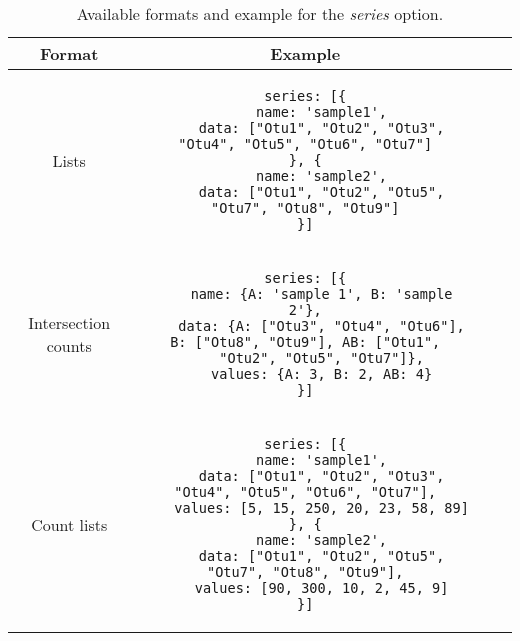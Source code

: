 \documentclass{bmcart}
\begin{document}
\begin{backmatter}
\begin{table}[h!]
\caption{Available formats and example for the \textit{series} option.}
      \begin{tabular}{cccc}
        \hline
        Format & Example\\ \hline
        Lists & 
\begin{lstlisting}
series: [{
	name: 'sample1',
	data: ["Otu1", "Otu2", "Otu3", "Otu4", "Otu5", "Otu6", "Otu7"]
}, {
	name: 'sample2',
	data: ["Otu1", "Otu2", "Otu5", "Otu7", "Otu8", "Otu9"]
}]
\end{lstlisting}\\ \hline
        Intersection counts & 
\begin{lstlisting}
series: [{
	name: {A: 'sample 1', B: 'sample 2'},
	data: {A: ["Otu3", "Otu4", "Otu6"], B: ["Otu8", "Otu9"], AB: ["Otu1",
	"Otu2", "Otu5", "Otu7"]},
	values: {A: 3, B: 2, AB: 4}
}]
\end{lstlisting}\\ \hline
        Count lists  &
\begin{lstlisting}
series: [{
	name: 'sample1',
	data: ["Otu1", "Otu2", "Otu3", "Otu4", "Otu5", "Otu6", "Otu7"],
	values: [5, 15, 250, 20, 23, 58, 89]
}, {
	name: 'sample2',
	data: ["Otu1", "Otu2", "Otu5", "Otu7", "Otu8", "Otu9"],
	values: [90, 300, 10, 2, 45, 9]
}]
\end{lstlisting}\\ \hline
      \end{tabular}
\end{table}

\end{backmatter}
\end{document}
